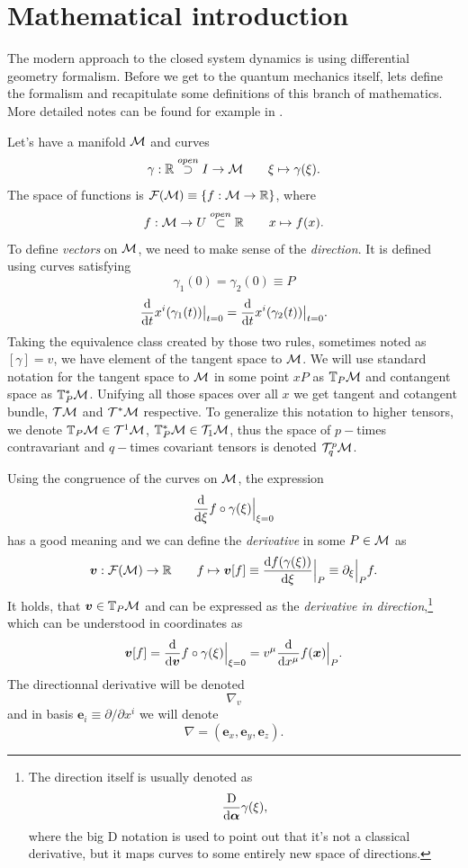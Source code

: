 \chapter{Mathematical introduction}
The modern approach to the closed system dynamics is using differential geometry formalism. Before we get to the quantum mechanics itself, lets define the formalism and recapitulate some definitions of this branch of mathematics. More detailed notes can be found for example in \citep{fecko}.

Let's have a manifold $\mathcal{M}$ and curves 
$$\gamma:\mathbb{R} \overset{open}{\supset} I \rightarrow \mathcal{M} \qquad \xi\mapsto \gamma(\xi).$$ 
The space of functions is $\mathcal{F}(\mathcal{M})\equiv\{f:\mathcal{M}\rightarrow \mathbb{R}\}$, where 
$$f:\mathcal{M}\rightarrow U\overset{open}{\subset} \mathbb{R} \qquad x\mapsto f(x).$$
To define \emph{vectors} on $\mathcal{M}$, we need to make sense of the \emph{direction}. It is defined using curves satisfying 
$$\gamma_1(0)=\gamma_2(0)\equiv P$$
$$\frac{\mathrm{d} }{\mathrm{d} t}x^i(\gamma_1(t))\big|_{t=0}=\frac{\mathrm{d} }{\mathrm{d} t}x^i(\gamma_2(t))\big|_{t=0}.$$
Taking the equivalence class created by those two rules, sometimes noted as $[\gamma]=v$, we have element of the tangent space to $\mathcal{M}$. We will use standard notation for the tangent space to $\mathcal{M}$ in some point $xP$ as $\mathbb{T}_P\mathcal{M}$ and contangent space as $\mathbb{T}^*_P\mathcal{M}$. Unifying all those spaces over all $x$ we get tangent and cotangent bundle, $\mathcal{T}\mathcal{M}$ and $\mathcal{T}^*\mathcal{M}$ respective. To generalize this notation to higher tensors, we denote $\mathbb{T}_P\mathcal{M}\in \mathcal{T}^1\mathcal{M}$, $\mathbb{T}^*_P\mathcal{M}\in \mathcal{T}_1\mathcal{M}$, thus the space of $p-$times contravariant and $q-$times covariant tensors is denoted $\mathcal{T}^p_q\mathcal{M}$.

Using the congruence of the curves on $\mathcal{M}$, the expression 
\begin{equation}
    \frac{\mathrm{d} }{\mathrm{d} \xi}f\circ \gamma(\xi)\Big|_{\xi=0}
\end{equation}
has a good meaning and we can define the \emph{derivative} in some $P\in\mathcal{M}$ as
\begin{equation}
    \bm v: \mathcal{F}(\mathcal{M})\rightarrow \mathbb{R} \qquad f\mapsto \bm v[f]\equiv \frac{\mathrm{d} f(\gamma(\xi))}{\mathrm{d} \xi}\Big|_P \equiv \partial_\xi\Big|_P f .
\end{equation}
It holds, that $\bm v\in \mathbb{T}_P\mathcal{M}$ and can be expressed as the \emph{derivative in direction},\footnote{
        The direction itself is usually denoted as
        \begin{equation}
            \frac{\mathrm{D}}{\mathrm{d}\bm\alpha}\gamma(\xi),
        \end{equation}
        where the big D notation is used to point out that it's not a classical derivative, but it maps curves to some entirely new space of directions.
    } 
which can be understood in coordinates as
\begin{equation}
    \bm v[f] = \frac{\mathrm{d} }{\mathrm{d} \bm v} f\circ \gamma(\xi)\Big|_{\xi=0}=v^\mu\frac{\mathrm{d} }{\mathrm{d} x^\mu} f(\bm x)\Big|_{P}.
\end{equation}
The directionnal derivative will be denoted 
$$\nabla_v$$
and in basis $\bm e_i \equiv \partial/\partial x^i$ we will denote 
$$\nabla=(\bm e_x, \bm e_y,\bm e_z).$$



